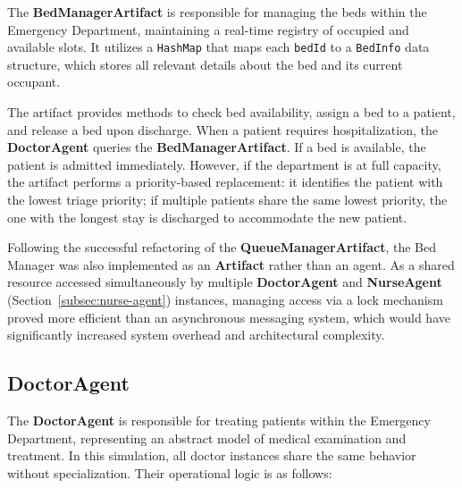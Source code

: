 \documentclass{article}[12pt]
\begin{document}
\noindent
The \textbf{BedManagerArtifact} is responsible for managing the beds within the Emergency Department, maintaining a real-time registry of occupied and available slots. It utilizes a \texttt{HashMap} that maps each \texttt{bedId} to a \texttt{BedInfo} data structure, which stores all relevant details about the bed and its current occupant.

\noindent
The artifact provides methods to check bed availability, assign a bed to a patient, and release a bed upon discharge. When a patient requires hospitalization, the \textbf{DoctorAgent} queries the \textbf{BedManagerArtifact}. If a bed is available, the patient is admitted immediately. However, if the department is at full capacity, the artifact performs a priority-based replacement: it identifies the patient with the lowest triage priority; if multiple patients share the same lowest priority, the one with the longest stay is discharged to accommodate the new patient.

\noindent
Following the successful refactoring of the \textbf{QueueManagerArtifact}, the Bed Manager was also implemented as an \textbf{Artifact} rather than an agent. As a shared resource accessed simultaneously by multiple \textbf{DoctorAgent} and \textbf{NurseAgent} (Section~\ref{subsec:nurse-agent}) instances, managing access via a lock mechanism proved more efficient than an asynchronous messaging system, which would have significantly increased system overhead and architectural complexity.

\subsection{DoctorAgent}
\label{subsec:doctor-agent}

\noindent
The \textbf{DoctorAgent} is responsible for treating patients within the Emergency Department, representing an abstract model of medical examination and treatment. In this simulation, all doctor instances share the same behavior without specialization. Their operational logic is as follows:
\end{document}
